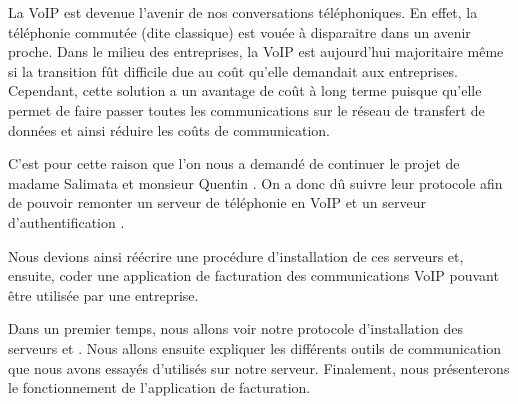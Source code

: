
La VoIP est devenue l'avenir de nos conversations téléphoniques. En effet, la téléphonie commutée (dite classique) est vouée à disparaitre dans un avenir proche. Dans le milieu des entreprises, la VoIP est aujourd'hui majoritaire même si la transition fût difficile due au coût qu'elle demandait aux entreprises. Cependant, cette solution a un avantage de coût à long terme puisque qu'elle permet de faire passer toutes les communications sur le réseau de transfert de données et ainsi réduire les coûts de communication.

C'est pour cette raison que l'on nous a demandé de continuer le projet de madame Salimata  et monsieur Quentin . On a donc dû suivre leur protocole afin de pouvoir remonter un serveur de téléphonie en VoIP {\kam} et un serveur d'authentification {\rad}.

Nous devions ainsi réécrire une procédure d'installation de ces serveurs et, ensuite, coder une application de facturation des communications VoIP pouvant être utilisée par une entreprise.

Dans un premier temps, nous allons voir notre protocole d'installation des serveurs {\kam} et {\frad}. Nous allons ensuite expliquer les différents outils de communication que nous avons essayés d'utilisés sur notre serveur. Finalement, nous présenterons le fonctionnement de l'application de facturation.